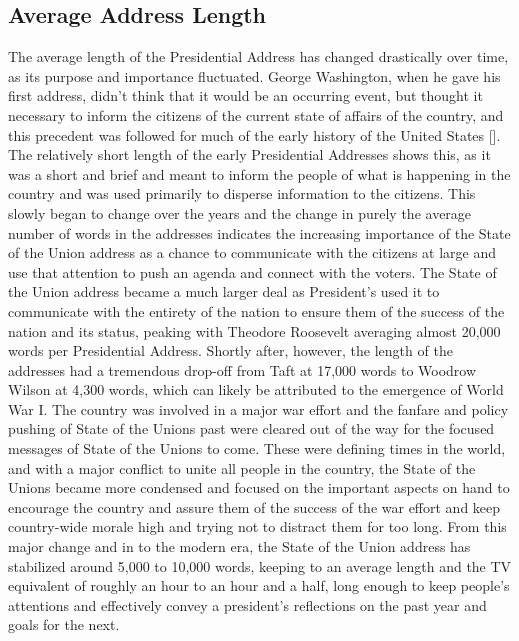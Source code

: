 \subsection{Average Address Length}
The average length of the Presidential Address has changed drastically over time, as its purpose and importance fluctuated.
George Washington, when he gave his first address, didn't think that it would be an occurring event, but thought it necessary to inform the citizens of the current state of affairs of the country, and this precedent was followed for much of the early history of the United States [\cite{freeman1948george}].
The relatively short length of the early Presidential Addresses shows this, as it was a short and brief and meant to inform the people of what is happening in the country and was used primarily to disperse information to the citizens.
This slowly began to change over the years and the change in purely the average number of words in the addresses indicates the increasing importance of the State of the Union address as a chance to communicate with the citizens at large and use that attention to push an agenda and connect with the voters.
The State of the Union address became a much larger deal as President's used it to communicate with the entirety of the nation to ensure them of the success of the nation and its status, peaking with Theodore Roosevelt averaging almost 20,000 words per Presidential Address.
Shortly after, however, the length of the addresses had a tremendous drop-off from Taft at 17,000 words to Woodrow Wilson at 4,300 words, which can likely be attributed to the emergence of World War I.
The country was involved in a major war effort and the fanfare and policy pushing of State of the Unions past were cleared out of the way for the focused messages of State of the Unions to come.
These were defining times in the world, and with a major conflict to unite all people in the country, the State of the Unions became more condensed and focused on the important aspects on hand to encourage the country and assure them of the success of the war effort and keep country-wide morale high and trying not to distract them for too long.
From this major change and in to the modern era, the State of the Union address has stabilized around 5,000 to 10,000 words, keeping to an average length and the TV equivalent of roughly an hour to an hour and a half, long enough to keep people's attentions and effectively convey a president's reflections on the past year and goals for the next.

